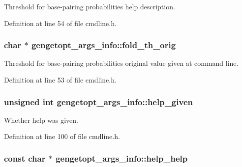 Threshold for base-\/pairing probabilities help description. 



Definition at line 54 of file cmdline.\+h.

\hypertarget{structgengetopt__args__info_a281837484d9e42893a583d0a850cd610}{
\subsubsection[{fold\+\_\+th\+\_\+orig}]{\setlength{\rightskip}{0pt plus 5cm}char $\ast$ gengetopt\+\_\+args\+\_\+info\+::fold\+\_\+th\+\_\+orig}}\label{structgengetopt__args__info_a281837484d9e42893a583d0a850cd610}


Threshold for base-\/pairing probabilities original value given at command line. 



Definition at line 53 of file cmdline.\+h.

\hypertarget{structgengetopt__args__info_ab9fd677f890731fd7d6f6c62e6dfc99c}{
\subsubsection[{help\+\_\+given}]{\setlength{\rightskip}{0pt plus 5cm}unsigned int gengetopt\+\_\+args\+\_\+info\+::help\+\_\+given}}\label{structgengetopt__args__info_ab9fd677f890731fd7d6f6c62e6dfc99c}


Whether help was given. 



Definition at line 100 of file cmdline.\+h.

\hypertarget{structgengetopt__args__info_a6497d9a5edee41da66eb109f093781a7}{
\subsubsection[{help\+\_\+help}]{\setlength{\rightskip}{0pt plus 5cm}const char $\ast$ gengetopt\+\_\+args\+\_\+info\+::help\+\_\+help}}\label{structgengetopt__args__info_a6497d9a5edee41da66eb109f093781a7}


